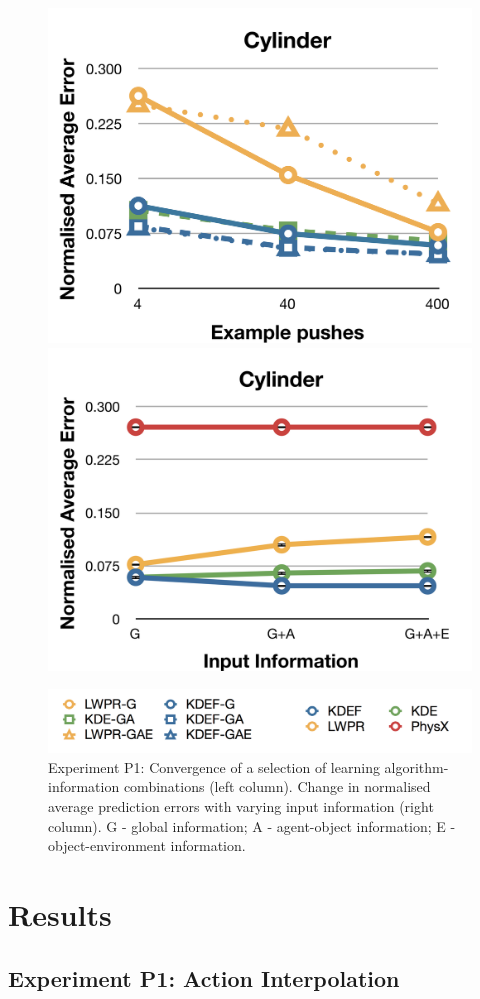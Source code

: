 \begin{figure}[t]
\centerline{\includegraphics[width=0.45\columnwidth]{graphs_jw/L3av_graph}
                 \includegraphics[width=0.45\columnwidth]{graphs_jw/L1av_graph_cylinder}
}
\centerline{\includegraphics[width=\linewidth]{graphs_jw/L1_convergence_graph_key}}
\vspace{-1mm}
\caption{Experiment P1: Convergence of a selection of learning
  algorithm-information combinations (left column). Change in normalised average prediction
  errors with varying input information (right column). G - global information; A -
  agent-object information; E - object-environment information.}
\label{fig:Lgraphs}
\end{figure}






\section{Results}\label{sec:Results}

\subsection{Experiment P1: Action Interpolation}\label{sec:Results.Learning}

